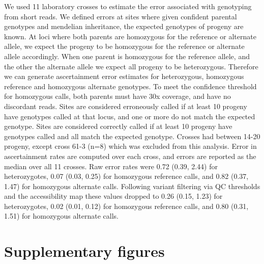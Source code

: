 \documentclass[a4paper,11pt,abstracton,hidelinks]{scrartcl}
\newcommand{\beginsupplement}{%
  \setcounter{table}{0}
  \renewcommand{\thetable}{S\arabic{table}}%
  \setcounter{figure}{0}
  \renewcommand{\thefigure}{S\arabic{figure}}%
}
\begin{document}
We used 11 laboratory crosses to estimate the error associated with genotyping from short reads. 
%
We defined errors at sites where given confident parental genotypes and mendelian inheritance, the expected genotypes of progeny are known. 
%
At loci where both parents are homozygous for the reference or alternate allele, we expect the progeny to be homozygous for the reference or alternate allele accordingly.
%
When one parent is homozygous for the reference allele, and the other the alternate allele we expect all progeny to be heterozygous. 
%
Therefore we can generate ascertainment error estimates for heterozygous, homozygous reference and homozygous alternate genotypes.
%
To meet the confidence threshold for homozygous calls, both parents must have 30x coverage, and have no discordant reads.
%
%
Sites are considered erroneously called if at least 10 progeny have genotypes called at that locus, and one or more do not match the expected genotype. 
%
Sites are considered correctly called if at least 10 progeny have genotypes called and all match the expected genotype. 
%
Crosses had between 14-20 progeny, except cross 61-3 (n=8) which was excluded from this analysis.
%
%
Error in ascertainment rates are computed over each cross, and errors are reported as the median over all 11 crosses. 
%
%
Raw error rates were 0.72 (0.39, 2.44) for heterozygotes, 0.07 (0.03, 0.25) for homozygous reference calls, and 0.82 (0.37, 1.47) for homozygous alternate calls. 
%
Following variant filtering via QC thresholds and the accessibility map these values dropped to 0.26 (0.15, 1.23) for heterozygotes, 0.02 (0.01, 0.12) for homozygous reference calls, and 0.80 (0.31, 1.51) for homozygous alternate calls. 





\beginsupplement

\section*{Supplementary figures}


\clearpage
\end{document}
